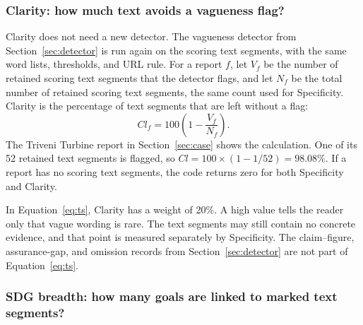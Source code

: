 \subsubsection{Clarity: how much text avoids a vagueness flag?}

Clarity does not need a new detector. The vagueness detector from Section~\ref{sec:detector} is run again on the scoring text segments, with the same word lists, thresholds, and URL rule. For a report $f$, let $V_f$ be the number of retained scoring text segments that the detector flags, and let $N_f$ be the total number of retained scoring text segments, the same count used for Specificity. Clarity is the percentage of text segments that are left without a flag:
\begin{equation}
Cl_f=100\left(1-\frac{V_f}{N_f}\right).
\label{eq:clarity}
\end{equation}
The Triveni Turbine report in Section~\ref{sec:case} shows the calculation. One of its 52 retained text segments is flagged, so $Cl=100\times(1-1/52)=98.08\%$. If a report has no scoring text segments, the code returns zero for both Specificity and Clarity.

In Equation~\eqref{eq:ts}, Clarity has a weight of 20\%. A high value tells the reader only that vague wording is rare. The text segments may still contain no concrete evidence, and that point is measured separately by Specificity. The claim--figure, assurance-gap, and omission records from Section~\ref{sec:detector} are not part of Equation~\eqref{eq:ts}.

\subsubsection{SDG breadth: how many goals are linked to marked text segments?}

